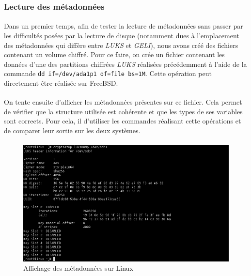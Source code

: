 \subsubsection{Lecture des métadonnées}
\paragraph{}
Dans un premier temps, afin de tester la lecture de métadonnées sans passer par
les difficultés posées par la lecture de disque (notamment dues à l'emplacement
des métadonnées qui diffère entre \textit{LUKS} et \textit{GELI}), nous avons
créé des fichiers contenant un volume chiffré. Pour ce faire, on crée un fichier
contenant les données d'une des partitions chiffrées \textit{LUKS} réalisées
précédemment à l'aide de la commande \texttt{dd if=/dev/ada1p1 of=file bs=1M}.
Cette opération peut directement être réalisée sur FreeBSD.
\paragraph{}
On tente ensuite d'afficher les métadonnées présentes sur ce fichier. Cela
permet de vérifier que la structure utilisée est cohérente et que les types de
ses variables sont corrects. Pour cela, il d'utiliser les commandes réalisant
cette opérations et de comparer leur sortie sur les deux systèmes.
\paragraph{}
\begin{figure}[h]
\centering
\includegraphics[width=.9\linewidth]{tests/linux_dump_disk.png}
\caption{\label{fig:linux_dump_eli}Affichage des métadonnées sur Linux}
\end{figure}
